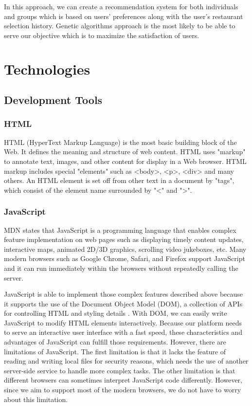 \documentclass[12pt,oneside,openright,a4paper]{cpe-english-project}
\begin{document}
In this approach, we can create a recommendation system for both individuals and groups which is based on users’ preferences along with the user's restaurant selection history. Genetic algorithms approach is the most likely to be able to serve our objective which is to maximize the satisfaction of users.

\section{Technologies}

\subsection{Development Tools}

\subsubsection{HTML}

HTML (HyperText Markup Language) is the most basic building block of the Web. It defines the meaning and structure of web content. HTML uses "markup" to annotate text, images, and other content for display in a Web browser. HTML markup includes special "elements" such as <body>, <p>, <div> and many others. An HTML element is set off from other text in a document by "tags", which consist of the element name surrounded by "<" and ">". \cite{HTMLHyperTextMarkupLanguage}

\subsubsection{JavaScript}

MDN \cite{JavaScript} states that JavaScript is a programming language that enables complex feature implementation on web pages such as displaying timely content updates, interactive maps, animated 2D/3D graphics, scrolling video jukeboxes, etc. Many modern browsers such as Google Chrome, Safari, and Firefox support JavaScript and it can run immediately within the browsers without repeatedly calling the server.

JavaScript is able to implement those complex features described above because it supports the use of the Document Object Model (DOM), a collection of APIs for controlling HTML and styling details \cite{Manipulatingdocuments}. With DOM, we can easily write JavaScript to modify HTML elements interactively.
Because our platform needs to serve an interactive user interface with a fast speed, these characteristics and advantages of JavaScript can fulfill those requirements. However, there are limitations of JavaScript. The first limitation is that it lacks the feature of reading and writing local files for security reasons, which needs the use of another server-side service to handle more complex tasks. The other limitation is that different browsers can sometimes interpret JavaScript code differently. However, since we aim to support most of the modern browsers, we do not have to worry about this limitation.
\end{document}
